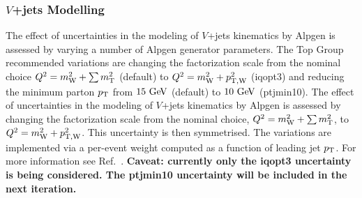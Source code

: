 \subsubsection{$V$+jets Modelling}
\ifIsINT 
The effect of uncertainties in the modeling of $V$+jets kinematics by {\sc Alpgen}  is assessed by varying a number of {\sc Alpgen} 
generator parameters. 
The Top Group recommended variations are changing the factorization scale from the nominal
choice $Q^2 =m_{\rm W}^2+\sum m_{\rm T}^2$ (default) to $Q^2 =m_{\rm W}^2+p_{\rm T,W}^2$  (iqopt3) and reducing the
minimum parton $\pt$ from $15\gev$ (default) to $10\gev$ (ptjmin10). 
\else
The effect of uncertainties in the modeling of $V$+jets kinematics by {\sc Alpgen}  is assessed by changing the factorization scale from the nominal
choice, $Q^2 =m_{\rm W}^2+\sum m_{\rm T}^2$, to $Q^2 =m_{\rm W}^2+p_{\rm T,W}^2$. This uncertainty is then symmetrised.
\fi
\ifIsINT 
The variations are implemented via a per-event weight computed as a function of leading jet $\pt$. For more information see Ref.~\cite{WjetsReweighting}.
{\bf Caveat: currently only the iqopt3 uncertainty is being considered. The ptjmin10 uncertainty will be included in the next iteration.}
\fi
